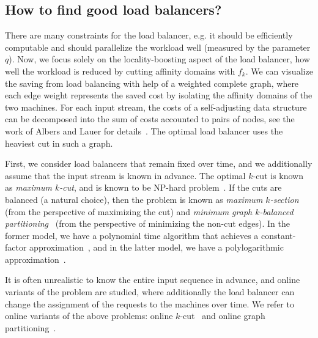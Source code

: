 \subsection{How to find good load balancers?}
There are many constraints for the load balancer, e.g. it should be efficiently computable and should parallelize the workload well (measured by the parameter $q$).
Now, we focus solely on the locality-boosting aspect of the load balancer, how well the workload is reduced by cutting affinity domains with $f_k$.
We can visualize the saving from load balancing with help of a weighted complete graph, where each edge weight represents the saved cost by isolating the affinity domains of the two machines.
For each input stream, the costs of a self-adjusting data structure can be decomposed into the sum of costs accounted to pairs of nodes, see the work of Albers and Lauer for details~\cite{AlbersL16}.
The optimal load balancer uses the heaviest cut in such a graph.


First, we consider load balancers that remain fixed over time, and we additionally assume that the input stream is known in advance.
The optimal $k$-cut is known as \emph{maximum $k$-cut}, and is known to be NP-hard problem~\cite{Frieze97,Mahajan95}.
If the cuts are balanced (a natural choice), then the problem is known as \emph{maximum $k$-section}~\cite{Andersson99} (from the perspective of maximizing the cut) and \emph{minimum graph $k$-balanced partitioning}~\cite{AndreevR06}  (from the perspective of minimizing the non-cut edges).
In the former model, we have a polynomial time algorithm that achieves a constant-factor approximation~\cite{Andersson99}, and in the latter model, we have a polylogarithmic approximation~\cite{AndreevR06}.

It is often unrealistic to know the entire input sequence in advance, and online variants of the problem are studied, where additionally the load balancer can change the assignment of the requests to the machines over time.
We refer to online variants of the above problems: online $k$-cut~\cite{Bar-NoyL12} and online graph partitioning~\cite{AvinBLPS20}.










